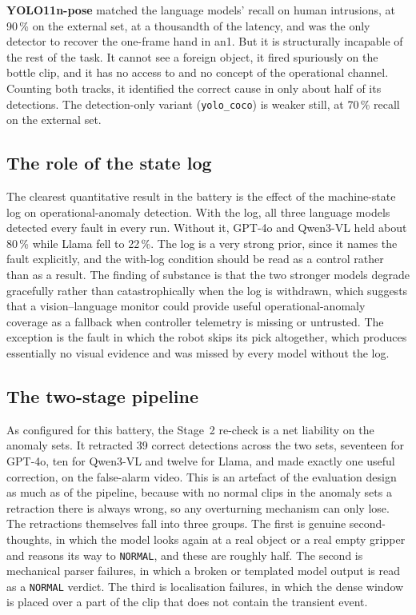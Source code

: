 \documentclass[11pt,a4paper]{article}
\begin{document}
\textbf{YOLO11n-pose} matched the language models' recall on human
intrusions, at 90\,\% on the external set, at a thousandth of the latency,
and was the only detector to recover the one-frame hand in an1. But it is
structurally incapable of the rest of the task. It cannot see a foreign
object, it fired spuriously on the bottle clip, and it has no access to
and no concept of the operational channel. Counting both tracks, it
identified the correct cause in only about half of its detections. The
detection-only variant (\texttt{yolo\_coco}) is weaker still, at 70\,\%
recall on the external set.

\subsection{The role of the state log}

The clearest quantitative result in the battery is the effect of the
machine-state log on operational-anomaly detection. With the log, all
three language models detected every fault in every run. Without it,
GPT-4o and Qwen3-VL held about 80\,\% while Llama fell to 22\,\%. The log
is a very strong prior, since it names the fault explicitly, and the
with-log condition should be read as a control rather than as a result.
The finding of substance is that the two stronger models degrade
gracefully rather than catastrophically when the log is withdrawn, which
suggests that a vision--language monitor could provide useful
operational-anomaly coverage as a fallback when controller telemetry is
missing or untrusted. The exception is the fault in which the robot skips
its pick altogether, which produces essentially no visual evidence and
was missed by every model without the log.

\subsection{The two-stage pipeline}

As configured for this battery, the Stage~2 re-check is a net liability on
the anomaly sets. It retracted 39 correct detections across the two sets,
seventeen for GPT-4o, ten for Qwen3-VL and twelve for Llama, and made
exactly one useful correction, on the false-alarm video. This is an
artefact of the evaluation design as much as of the pipeline, because with
no normal clips in the anomaly sets a retraction there is always wrong, so
any overturning mechanism can only lose. The retractions themselves fall
into three groups. The first is genuine second-thoughts, in which the
model looks again at a real object or a real empty gripper and reasons its
way to \texttt{NORMAL}, and these are roughly half. The second is
mechanical parser failures, in which a broken or templated model output is
read as a \texttt{NORMAL} verdict. The third is localisation failures, in
which the dense window is placed over a part of the clip that does not
contain the transient event.
\end{document}

